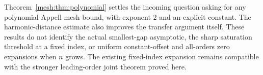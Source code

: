 \begin{remark}
Theorem~\ref{mesh:thm:polynomial} settles the incoming question asking
for any polynomial Appell mesh bound, with exponent $2$ and an explicit
constant. The harmonic-distance estimate also improves the transfer
argument itself. These results do not identify the actual smallest-gap
asymptotic, the sharp saturation threshold at a fixed index, or uniform
constant-offset and all-orders zero expansions when $n$ grows. The
existing fixed-index expansion remains compatible with the stronger
leading-order joint theorem proved here.
\end{remark}
